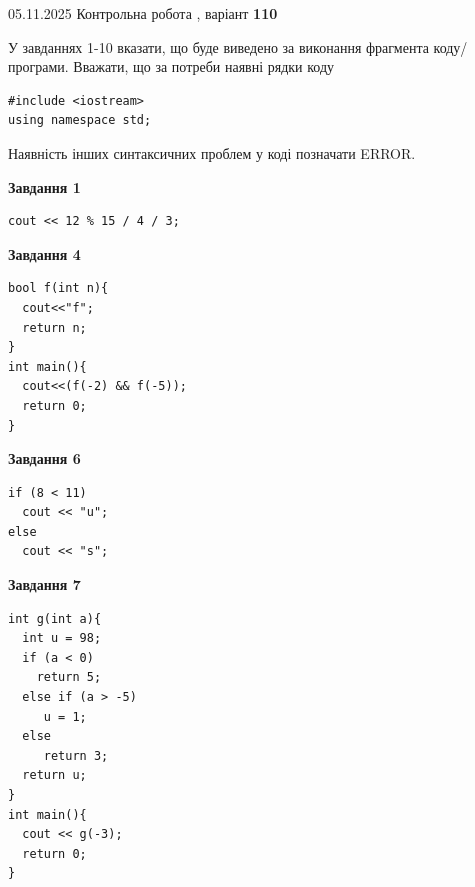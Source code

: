 \documentclass[12pt, ukrainian]{article}
\begin{document}
{\Large{05.11.2025 Контрольна робота , варіант  \No \textbf { 110 }\par}}
{
\begin {large}
У завданнях 1-10 вказати, що буде виведено за виконання фрагмента коду/про\-гра\-ми.
Вважати, що за потреби наявні рядки коду
\begin{verbatim}
#include <iostream>
using namespace std;
\end{verbatim}
Наявність інших синтаксичних проблем у коді позначати ERROR.

\begin{minipage}[t]{7.0cm}

\begin{center}
\textbf{Завдання 1}
\end{center}
\vspace{-8mm}

\begin{verbatim}
cout << 12 % 15 / 4 / 3;
\end{verbatim}



\begin{center}
\textbf{Завдання 4}
\end{center}
\vspace{-8mm}

\begin{verbatim}
bool f(int n){
  cout<<"f";
  return n;
}
int main(){
  cout<<(f(-2) && f(-5));
  return 0;
}
\end{verbatim}



\begin{center}
\textbf{Завдання 6}
\end{center}
\vspace{-8mm}

\begin{verbatim}
if (8 < 11)
  cout << "u";
else
  cout << "s";
\end{verbatim}



\begin{center}
\textbf{Завдання 7}
\end{center}
\vspace{-8mm}

\begin{verbatim}
int g(int a){
  int u = 98;
  if (a < 0)
    return 5;
  else if (a > -5)
     u = 1;
  else
     return 3;
  return u;
}
int main(){
  cout << g(-3);
  return 0;
}
\end{verbatim}


\end{minipage}
\end{large}}
\end{document}
